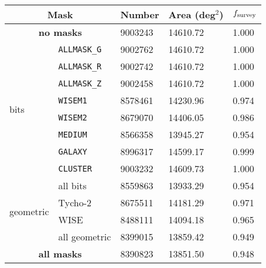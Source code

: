 {\centering
\noindent\begin{tabular}{p{1.0cm}p{1.5cm}p{1.3cm}p{1.4cm}p{0.6cm}}
\toprule
\multicolumn{2}{c}{Mask} & Number & Area (deg$^2$) & $f_{\rm survey}$ \\
\hline
\multicolumn{2}{c}{\textbf{no masks}} & 9003243 & 14610.72 & 1.000 \\
\hline
\multirow{8}{*}{bits}    & \texttt{ALLMASK\_G}  & 9002762 & 14610.72 & 1.000 \\
                          & \texttt{ALLMASK\_R}  & 9002742 & 14610.72 & 1.000 \\
                          & \texttt{ALLMASK\_Z}  & 9002458 & 14610.72 & 1.000 \\
                          & \texttt{WISEM1}  & 8578461 & 14230.96 & 0.974 \\
                          & \texttt{WISEM2}  & 8679070 & 14406.05 & 0.986 \\
                          & \texttt{MEDIUM}  & 8566358 & 13945.27 & 0.954 \\
                          & \texttt{GALAXY}  & 8996317 & 14599.17 & 0.999 \\
                          & \texttt{CLUSTER} & 9003232 & 14609.73 & 1.000 \\
\cmidrule{2-5}
                          & all bits     & 8559863 & 13933.29 & 0.954 \\
\hline
\multirow{2}{*}{geometric} & Tycho-2  & 8675511 & 14181.29 & 0.971 \\
                           & WISE    & 8488111 & 14094.18 & 0.965 \\
\cmidrule{2-5}
                           & all geometric    & 8399015 & 13859.42 & 0.949 \\
\hline
\multicolumn{2}{c}{\textbf{all masks}} & 8390823 & 13851.50 & 0.948 \\
\bottomrule
\end{tabular}}